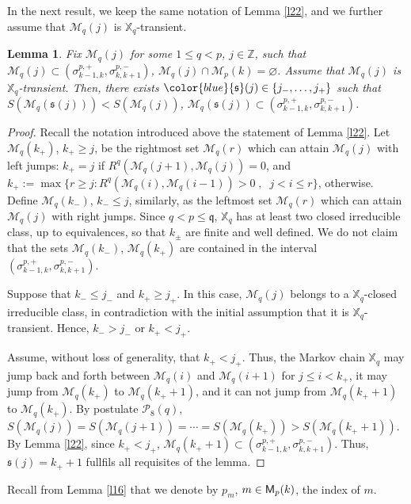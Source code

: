 \documentclass[reqno]{amsart}
\theoremstyle{plain}
\newtheorem{lemma}[theorem]{Lemma}
\theoremstyle{definition}
\newcommand{\mc}[1]{{\mathcal #1}}
\newcommand{\mf}[1]{{\mathfrak #1}}
\newcommand{\bb}[1]{{\mathbb #1}}
\newcommand{\ms}[1]{{\mathscr #1}}
\newcommand{\mss}[1]{{\textsf #1}}
\newcounter{as}[section]
\newcommand{\<}{\langle}
\renewcommand{\>}{\rangle}
\begin{document}
In the next result, we keep the same notation of Lemma \ref{l22}, and
we further assume that $\ms M_{q}(j)$ is $\bb X_q$-transient.

\begin{lemma}
\label{l23}
Fix $\ms M_{q}(j)$ for some $1\le q<p$,
$j \in \bb Z$, such that
$\ms M_{q}(j) \subset (\sigma^{p,+}_{k-1,k},
\sigma^{p,-}_{k,k+1})$,
$\ms M_{q}(j) \cap \ms M_{p}(k) =
\varnothing$. Assume that $\ms M_{q}(j)$ is $\bb X_q$-transient.
Then, there exists
${\color{blue} \mf s(j)} \in \{j_-, \dots, j_+\}$ such that
$S(\ms M_{q}(\mf s(j))) < S(\ms M_{q}(j))$,
$\ms M_{q}(\mf s(j)) \subset (\sigma^{p,+}_{k-1,k},
\sigma^{p,-}_{k,k+1})$.
\end{lemma}

\begin{proof}
Recall the notation introduced above the statement of Lemma \ref{l22}.
Let $\ms M_{q}(k_+)$, $k_+\ge j$, be the rightmost set $\ms M_{q}(r)$
which can attain $\ms M_{q}(j)$ with left jumps: $k_+=j$ if
$R^q(\ms M_{q} (j+1), \ms M_{q}(j))=0$, and
$k_+ := \max \{ r \ge j : R^q(\ms M_{q} (i), \ms M_{q}(i-1))>0 \;,\;\;
j<i\le r\}$, otherwise. Define $\ms M_{q}(k_-)$, $k_-\le j$,
similarly, as the leftmost set $\ms M_{q}(r)$ which can attain
$\ms M_{q}(j)$ with right jumps. Since $q<p\le \mf q$, $\bb X_q$ has
at least two closed irreducible class, up to equivalences, so that
$k_\pm$ are finite and well defined.  We do not claim that the sets
$\ms M_{q}(k_-)$, $\ms M_{q}(k_+)$ are contained in the interval
$(\sigma^{p,+}_{k-1,k}, \sigma^{p,-}_{k,k+1})$.

Suppose that $k_-\le j_-$ and $k_+\ge j_+$. In this case,
$\ms M_{q}(j)$ belongs to a $\bb X_q$-closed irreducible class, in
contradiction with the initial assumption that it is
$\bb X_q$-transient. Hence, $k_-> j_-$ or $k_+ < j_+$.

Assume, without loss of generality, that $k_+ < j_+$. Thus, the Markov
chain $\bb X_q$ may jump back and forth between $\ms M_{q}(i)$ and
$\ms M_{q}(i+1)$ for $j\le i < k_+$, it may jump from $\ms M_{q}(k_+)$
to $\ms M_{q}(k_++1)$, and it can not jump from $\ms M_{q}(k_++1)$ to
$\ms M_{q}(k_+)$. By postulate $\mc P_8(q)$,
$S(\ms M_{q}(j)) = S(\ms M_{q}(j +1)) = \cdots = S(\ms M_{q}(k_+)) >
S(\ms M_{q}(k_+ +1))$. By Lemma \ref{l22}, since $k_+ < j_+$,
$\ms M_{q}(k_+ +1) \subset (\sigma^{p,+}_{k-1,k},
\sigma^{p,-}_{k,k+1})$. Thus, $\mf s(j) = k_+ +1$ fullfils all
requisites of the lemma.
\end{proof}

Recall from Lemma \ref{l16} that we denote by $p_m$,
$m\in \mss M_p(k)$, the index of $m$.
\end{document}
